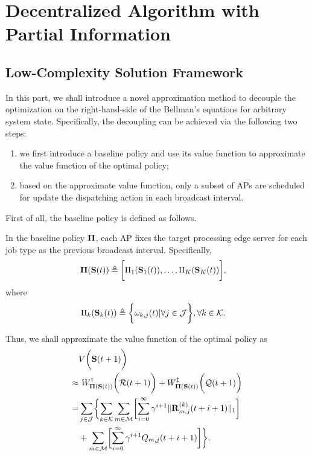 \section{Decentralized Algorithm with Partial Information}
\label{sec:algorithm}

\subsection{Low-Complexity Solution Framework}
In this part, we shall introduce a novel approximation method to decouple the optimization on the right-hand-side of the Bellman's equations for arbitrary system state.
Specifically, the decoupling can be achieved via the following two steps:
\begin{enumerate}
    \item we first introduce a baseline policy and use its value function to approximate the value function of the optimal policy;
    \item based on the approximate value function, only a {subset of APs} are scheduled for update the dispatching action in each broadcast interval.
\end{enumerate}
First of all, the baseline policy is defined as follows.
\begin{definition}
    In the baseline policy $\boldsymbol{\Pi}$, each AP fixes the target processing edge server for each job type as the previous broadcast interval. Specifically,
    \begin{align}
        \boldsymbol{\Pi}(\mathbf{S}(t)) &\triangleq \bigg[ \Pi_{1}(\mathbf{S}_{1}(t)), \dots, \Pi_{K}(\mathbf{S}_{K}(t)) \bigg],
    \end{align}
    where 
    \begin{align}
        \Pi_{k}(\mathbf{S}_{k}(t)) &\triangleq \bigg\{
            \omega_{k,j}(t) | \forall j\in\mathcal{J}
        \bigg\}, \forall k\in\mathcal{K}.
    \end{align}
\end{definition}

Thus, we shall approximate the value function of the optimal policy as
\begin{align}
    &V\Paren{\Stat(t+1)} 
    \nonumber\\
    \approx&~ W^{\dagger}_{\Baseline(\Stat(t))} \Paren{\mathcal{R}(t+1)} + W^{\ddagger}_{\Baseline(\Stat(t))}\Paren{\mathcal{Q}(t+1)}
    \nonumber\\
    =& \sum_{j\in\jSpace}\Brace{
        \sum_{k\in\apSet}\sum_{m\in\esSet}\Bracket{ \sum_{i=0}^{\infty} \gamma^{i+1} \Inorm{\vec{R}^{(k)}_{m,j}(t+i+1)} }
        \nonumber\\
        & + \sum_{m\in\esSet} \Bracket{ \sum_{i=0}^{\infty} \gamma^{i+1} Q_{m,j}(t+i+1) }
    }.
\end{align}

